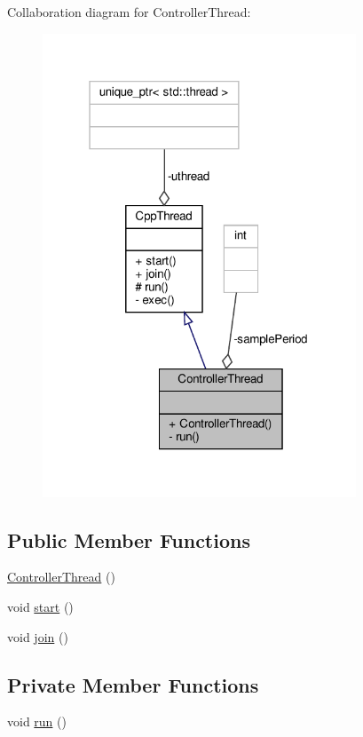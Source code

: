 Collaboration diagram for Controller\+Thread\+:\nopagebreak
\begin{figure}[H]
\begin{center}
\leavevmode
\includegraphics[width=265pt]{classControllerThread__coll__graph}
\end{center}
\end{figure}
\subsection*{Public Member Functions}
\begin{DoxyCompactItemize}
\item 
\hyperlink{classControllerThread_a00cd6502504f5f1e680e6be3f60a987d}{Controller\+Thread} ()
\item 
void \hyperlink{classCppThread_a1be46d1be000f41a763289300623c609}{start} ()
\item 
void \hyperlink{classCppThread_a8ff0fda6b913cc53764caef0e1200f3f}{join} ()
\end{DoxyCompactItemize}
\subsection*{Private Member Functions}
\begin{DoxyCompactItemize}
\item 
void \hyperlink{classControllerThread_ae8206a23ab1a414f2956424def2e759c}{run} ()
\end{DoxyCompactItemize}
